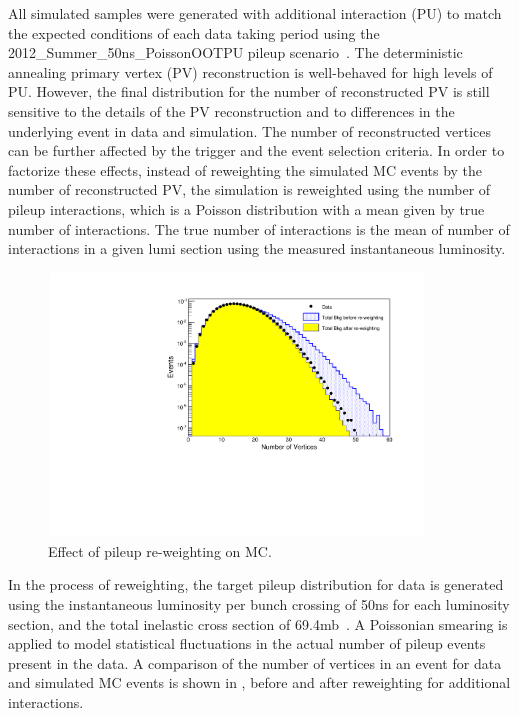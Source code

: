 All simulated samples were generated with additional  interaction (PU) to match the expected conditions of each data taking period using the 
2012\_Summer\_50ns\_PoissonOOTPU pileup scenario~\cite{Web:PileupScenario}. The deterministic annealing primary vertex (\gls{PV}) reconstruction is 
well-behaved for high levels of PU. However, the final distribution for the number of reconstructed PV is still sensitive to the details of the PV 
reconstruction and to differences in the underlying event in data and simulation. The number of reconstructed vertices can be further affected by the 
trigger and the event selection criteria. In order to factorize these effects, instead of reweighting the simulated MC events by the number of 
reconstructed PV, the simulation is reweighted using the number of pileup interactions, which is a Poisson distribution with a mean given by true number of
interactions.  The true number of interactions is the mean of number of interactions in a given lumi section using the measured instantaneous luminosity.

\begin{figure}[h!]
\centering
 \includegraphics[width=10cm,height=7cm]{ch5/plots/DataMC/pileUp_reweighting_v1.pdf}
 \caption{Effect of pileup re-weighting on MC.}
 \label{Fig:pileup}
\end{figure}
In the process of reweighting, the target pileup distribution for data is generated using the instantaneous luminosity per bunch crossing of 
50\unit{ns} for each luminosity section, and the total \pp inelastic cross section of 69.4\unit{mb}~\cite{Web:PileupScenario}. A Poissonian smearing 
is applied to model statistical fluctuations in the actual number of pileup events present in the data. A comparison of the number of vertices in an 
event for data and simulated MC events is shown in \fig{\ref{Fig:pileup}}, before and after reweighting for additional interactions. 

